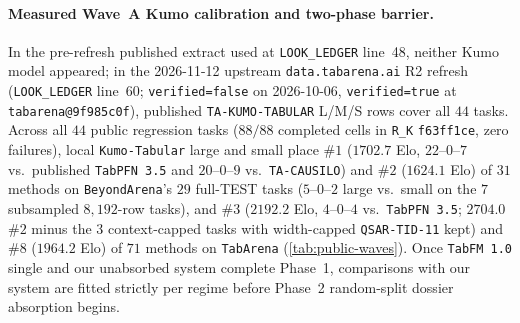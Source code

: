 \paragraph{Measured Wave~A Kumo calibration and two-phase barrier.}
In the pre-refresh published extract used at \texttt{LOOK\_LEDGER} line~48, neither Kumo model appeared; in the
2026-11-12 upstream \texttt{data.tabarena.ai} R2 refresh (\texttt{LOOK\_LEDGER} line~60; \texttt{verified=false} on
2026-10-06, \texttt{verified=true} at \texttt{tabarena@9f985c0f}), published \texttt{TA-KUMO-TABULAR} L/M/S rows cover
all $44$ tasks. Across all $44$ public
regression tasks ($88/88$ completed cells in \texttt{R\_K} \texttt{f63ff1ce}, zero failures), local \texttt{Kumo-Tabular}
large and small place $\#1$ ($1702.7$ Elo, $22$--$0$--$7$ vs.\ published \texttt{TabPFN 3.5} and $20$--$0$--$9$ vs.\
\texttt{TA-CAUSILO}) and $\#2$ ($1624.1$ Elo) of $31$ methods on \texttt{BeyondArena}'s $29$ full-TEST tasks ($5$--$0$--$2$
large vs.\ small on the $7$ subsampled $8{,}192$-row tasks), and $\#3$ ($2192.2$ Elo, $4$--$0$--$4$ vs.\ \texttt{TabPFN
3.5}; $2704.0$ $\#2$ minus the $3$ context-capped tasks with width-capped \texttt{QSAR-TID-11} kept) and $\#8$ ($1964.2$
Elo) of $71$ methods on \texttt{TabArena} (\cref{tab:public-waves}). Once \texttt{TabFM 1.0} single and our unabsorbed
system complete Phase~1, comparisons with our system are fitted strictly per regime before Phase~2 random-split dossier
absorption begins.
